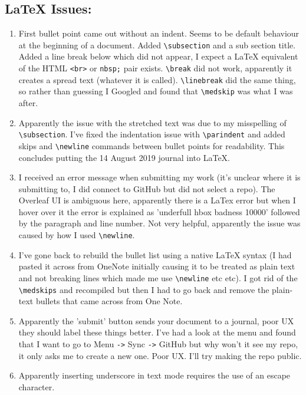 \documentclass{article}
\begin{document}
\begin{enumerate}
    \section{LaTeX Issues:}
    \begin{enumerate}
        \item First bullet point came out without an indent. Seems to be default behaviour at the beginning of a document. Added \verb!\subsection! and a sub section title. Added a line break below which did not appear, I expect a LaTeX equivalent of the HTML \verb!<br>! or \verb!nbsp;! pair exists. \verb!\break! did not work, apparently it creates a spread text (whatever it is called). \verb!\linebreak! did the same thing, so rather than guessing I Googled and found that \verb!\medskip! was what I was after.
        \item Apparently the issue with the stretched text was due to my misspelling of \verb!\subsection!. I've fixed the indentation issue with \verb!\parindent! and added skips and \verb!\newline! commands between bullet points for readability. This concludes putting the 14 August 2019 journal into LaTeX.
        \item  I received an error message when submitting my work (it's unclear where it is submitting to, I did connect to GitHub but did not select a repo). The Overleaf UI is ambiguous here, apparently there is a LaTex error but when I hover over it the error is explained as 'underfull hbox badness 10000' followed by the paragraph and line number. Not very helpful, apparently the issue was caused by how I used \verb!\newline!.
        \item I've gone back to rebuild the bullet list using a native LaTeX syntax (I had pasted it across from OneNote initially causing it to be treated as plain text and not breaking lines which made me use \verb!\newline! etc etc). I got rid of the \verb!\medskips! and recompiled but then I had to go back and remove the plain-text bullets that came across from One Note.
        \item Apparently the 'submit' button sends your document to a journal, poor UX they should label these things better. I've had a look at the menu and found that I want to go to Menu \verb!->! Sync \verb!->! GitHub but why won't it see my repo, it only asks me to create a new one. Poor UX. I'll try making the repo public.
        \item Apparently inserting underscore in text mode requires the use of an escape character.
    \end{enumerate}
\end{enumerate}
\end{document}

